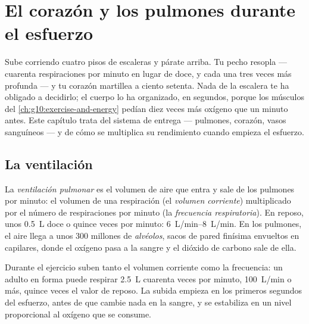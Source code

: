 \chapter{El corazón y los pulmones durante el esfuerzo}\label{ch:g10:heart-lungs-effort}

Sube corriendo cuatro pisos de escaleras y párate arriba. Tu pecho
resopla --- cuarenta respiraciones por minuto en lugar de doce, y cada
una tres veces más profunda --- y tu corazón martillea a ciento
setenta. Nada de la escalera te ha obligado a decidirlo; el cuerpo lo
ha organizado, en segundos, porque los músculos del
\cref{ch:g10:exercise-and-energy} pedían diez veces más oxígeno que un
minuto antes. Este capítulo trata del sistema de entrega --- pulmones,
corazón, vasos sanguíneos --- y de cómo se multiplica su rendimiento
cuando empieza el esfuerzo.

\section{La ventilación}

\begin{definition}[Ventilación]\label{def:g10:heart-lungs-effort:ventilation}
La \emph{ventilación pulmonar} es el volumen de aire
que entra y sale de los pulmones por minuto: el volumen de una
respiración (el \emph{volumen corriente}) multiplicado por el número de
respiraciones por minuto (la \emph{frecuencia respiratoria}). En
reposo, unos \qty{0.5}{L} doce o quince veces por minuto:
\qtyrange{6}{8}{L/min}. En los pulmones, el aire llega a unos 300
millones de \emph{alvéolos}, sacos de pared finísima
envueltos en capilares, donde el oxígeno pasa a la sangre y el dióxido
de carbono sale de ella.
\end{definition}

\begin{proposition}\label{prop:g10:heart-lungs-effort:vent-exercise}
Durante el ejercicio suben tanto el volumen corriente como la
frecuencia: un adulto en forma puede respirar \qty{2.5}{L} cuarenta
veces por minuto, \qty{100}{L/min} o más, quince veces el valor de
reposo. La subida empieza en los primeros segundos del esfuerzo, antes
de que cambie nada en la sangre, y se estabiliza en un nivel
proporcional al oxígeno que se consume.
\end{proposition}
\admitted

